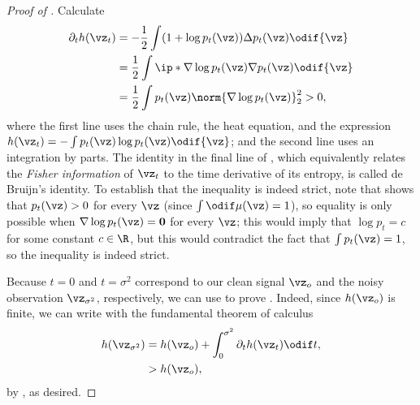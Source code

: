 \documentclass[../../book-main.tex]{subfiles}
\begin{document}
\begin{proof}[Proof of {}]
  Calculate
  \begin{equation}\label{eq:de-bruijn}
    \begin{split}
      \partial_t h(\vz_t)
      &=
      -\frac{1}{2} \int (1 + \log p_t(\vz)) \Delta p_t(\vz) \odif{\vz}
      \\
      &=
      \frac{1}{2} \int \ip*{\nabla \log p_t(\vz)}{\nabla p_t(\vz)} \odif{\vz}
      \\
      &= \frac{1}{2} \int p_t(\vz) \norm{\nabla \log p_t(\vz)}_2^2
      > 0,
    \end{split}
  \end{equation}
  where the first line uses the chain rule, the heat equation, and the expression
  $h(\vz_t) = -\int p_t(\vz) \log p_t(\vz) \odif{\vz}$; and the second line uses an integration by parts.
  The identity in the final line of , which equivalently
  relates the \textit{Fisher information} of $\vz_t$ to the time derivative of its
  entropy, is called de Bruijn's identity. 
  To establish that the inequality is indeed strict, note that
   shows that $p_t(\vz) > 0$
  for every $\vz$ (since $\int \odif \mu(\vz) = 1$), so equality is only
  possible when $\nabla \log p_t(\vz) = \mathbf{0}$ for every $\vz$; this would
  imply that $\log p_t = c$ for some constant $c \in \R$, but this would
  contradict the fact that $\int p_t(\vz) = 1$, so the inequality is indeed
  strict.

  Because $t=0$ and $t=\sigma^2$ correspond to our clean signal $\vz_o$ and the
  noisy observation $\vz_{\sigma^2}$, respectively,
  we can use  to prove . 
  Indeed, since $h(\vz_o)$ is finite, we can write with the fundamental theorem
  of calculus
  \begin{equation}\label{eq:de-bruijn-ftc}
    \begin{split}
    h(\vz_{\sigma^2}) &= h(\vz_o) + \int_0^{\sigma^2} \partial_t h(\vz_t) \odif t,
    \\
    &> h(\vz_o),
    \end{split}
  \end{equation}
  by , as desired.



\end{proof}
\end{document}
